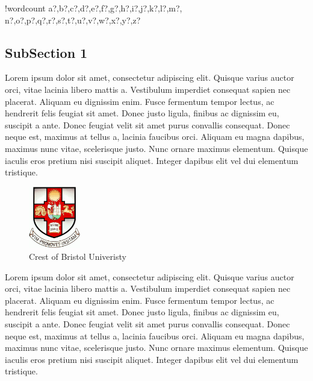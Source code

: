 \documentclass{article}
\newcounter{words}
\newenvironment{counted}{%
  \setcounter{words}{0}
  \SearchList!{wordcount}{\stepcounter{words}}
    {a?,b?,c?,d?,e?,f?,g?,h?,i?,j?,k?,l?,m?,
    n?,o?,p?,q?,r?,s?,t?,u?,v?,w?,x?,y?,z?}
  \UndoBoundary{'}
  \SearchOrder{p;}}{%
  \StopSearching}
\begin{document}
\begin{counted}
\subsection{SubSection 1}
Lorem ipsum dolor sit amet, consectetur adipiscing elit. Quisque varius auctor orci, vitae lacinia libero mattis a. Vestibulum imperdiet consequat sapien nec placerat. Aliquam eu dignissim enim. Fusce fermentum tempor lectus, ac hendrerit felis feugiat sit amet. Donec justo ligula, finibus ac dignissim eu, suscipit a ante. Donec feugiat velit sit amet purus convallis consequat. Donec neque est, maximus at tellus a, lacinia faucibus orci. Aliquam eu magna dapibus, maximus nunc vitae, scelerisque justo. Nunc ornare maximus elementum. Quisque iaculis eros pretium nisi suscipit aliquet. Integer dapibus elit vel dui elementum tristique.
\begin{figure}
  \centering
  \includegraphics[width=0.2\textwidth]{crestbris.png}
  \caption{Crest of Bristol Univeristy}
  \label{fig:BristolCrest}
  \vspace{-30pt}
\end{figure}
Lorem ipsum dolor sit amet, consectetur adipiscing elit. Quisque varius auctor orci, vitae lacinia libero mattis a. Vestibulum imperdiet consequat sapien nec placerat. Aliquam eu dignissim enim. Fusce fermentum tempor lectus, ac hendrerit felis feugiat sit amet. Donec justo ligula, finibus ac dignissim eu, suscipit a ante. Donec feugiat velit sit amet purus convallis consequat. Donec neque est, maximus at tellus a, lacinia faucibus orci. Aliquam eu magna dapibus, maximus nunc vitae, scelerisque justo. Nunc ornare maximus elementum. Quisque iaculis eros pretium nisi suscipit aliquet. Integer dapibus elit vel dui elementum tristique.


\end{counted}
\end{document}
